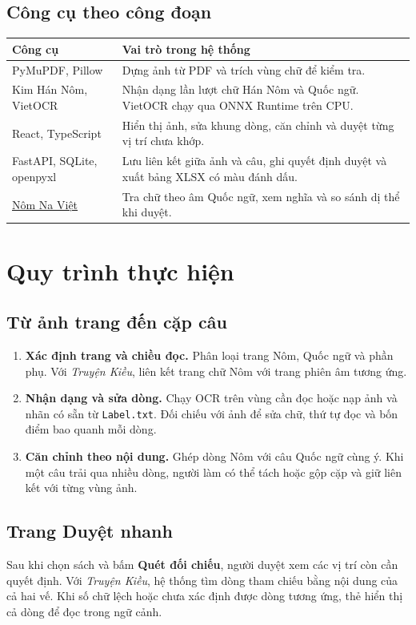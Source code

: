 \documentclass[11pt,a4paper]{article}
\begin{document}
\subsection*{Công cụ theo công đoạn}
\begin{tabularx}{\linewidth}{@{}p{.38\linewidth}Y@{}}
\toprule
\textbf{Công cụ} & \textbf{Vai trò trong hệ thống}\\ \midrule
PyMuPDF, Pillow & Dựng ảnh từ PDF và trích vùng chữ để kiểm tra.\\
Kim Hán Nôm, VietOCR & Nhận dạng lần lượt chữ Hán Nôm và Quốc ngữ. VietOCR chạy qua ONNX Runtime trên CPU.\\
React, TypeScript & Hiển thị ảnh, sửa khung dòng, căn chỉnh và duyệt từng vị trí chưa khớp.\\
FastAPI, SQLite, openpyxl & Lưu liên kết giữa ảnh và câu, ghi quyết định duyệt và xuất bảng XLSX có màu đánh dấu.\\
\href{https://nomnaviet.com/en/search}{Nôm Na Việt} & Tra chữ theo âm Quốc ngữ, xem nghĩa và so sánh dị thể khi duyệt.\\
\bottomrule
\end{tabularx}

\newpage
\section{Quy trình thực hiện}
\subsection*{Từ ảnh trang đến cặp câu}
\begin{enumerate}
\item \textbf{Xác định trang và chiều đọc.} Phân loại trang Nôm, Quốc ngữ và phần phụ. Với \textit{Truyện Kiều}, liên kết trang chữ Nôm với trang phiên âm tương ứng.
\item \textbf{Nhận dạng và sửa dòng.} Chạy OCR trên vùng cần đọc hoặc nạp ảnh và nhãn có sẵn từ \texttt{Label.txt}. Đối chiếu với ảnh để sửa chữ, thứ tự đọc và bốn điểm bao quanh mỗi dòng.
\item \textbf{Căn chỉnh theo nội dung.} Ghép dòng Nôm với câu Quốc ngữ cùng ý. Khi một câu trải qua nhiều dòng, người làm có thể tách hoặc gộp cặp và giữ liên kết với từng vùng ảnh.
\end{enumerate}

\subsection*{Trang Duyệt nhanh}
Sau khi chọn sách và bấm \textbf{Quét đối chiếu}, người duyệt xem các vị trí còn cần quyết định. Với \textit{Truyện Kiều}, hệ thống tìm dòng tham chiếu bằng nội dung của cả hai vế. Khi số chữ lệch hoặc chưa xác định được dòng tương ứng, thẻ hiển thị cả dòng để đọc trong ngữ cảnh.
\end{document}
